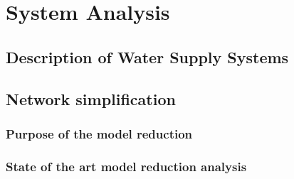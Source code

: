 
\part{System Analysis}
\label{system_analysis}

\chapter{Description of Water Supply Systems}
\label{description_of_water_supply_systems}

 





\chapter{Network simplification}
\label{network_simplification}

\section{Purpose of the model reduction}
\label{purpose_of_the_model_reduction}

\section{State of the art model reduction analysis}
\label{state_of_the_art_model_reduction_analysis}





























